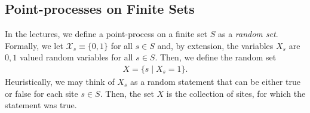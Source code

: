 \documentclass{article}
\begin{document}
\subsection{Point-processes on Finite Sets}
In the lectures, we define a point-process on a finite set $S$ as a \textit{random set}. Formally, we let $\mathcal{X}_s \equiv \{0,1\}$ for all $s \in S$ and, by extension, the variables $X_s$ are ${0,1}$ valued random variables for all $s \in S$. Then, we define the random set 
\begin{align}
    X = \{s \mid X_s = 1\}. 
\end{align}
Heuristically, we may think of $X_s$ as a random statement that can be either true or false for each site $s \in S$. Then, the set $X$ is the collection of sites, for which the statement was true. 




%
\end{document}
